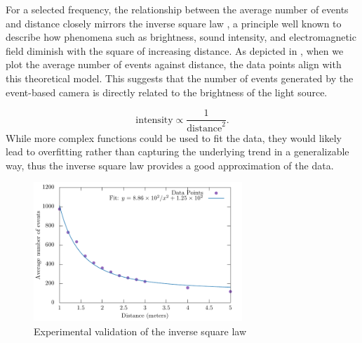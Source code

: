 For a selected frequency, the relationship between the average number of events and distance closely mirrors the inverse square
law , a principle well known to describe how phenomena such as brightness, sound intensity, and electromagnetic field
diminish with the square of increasing distance.
As depicted in , when we plot the average number of events against distance, the data points align with this theoretical model.
This suggests that the number of events generated by the event-based camera is directly related to the brightness of the light source.

\begin{equation}
    \text{intensity} \propto \frac{1}{\text{distance}^2} .
    \label{eq:inv_square_law}
\end{equation}
While more complex functions could be used to fit the data, they would likely lead to overfitting rather than capturing the underlying trend in a generalizable way, thus the inverse square law provides a good approximation of the data.
\begin{figure}[H]
	\centering
	\includegraphics[width=0.70\textwidth]{./fig/semestral/inverse_square/square.pdf}
	\caption{Experimental validation of the inverse square law}
	\label{fig:fit1}
\end{figure}

